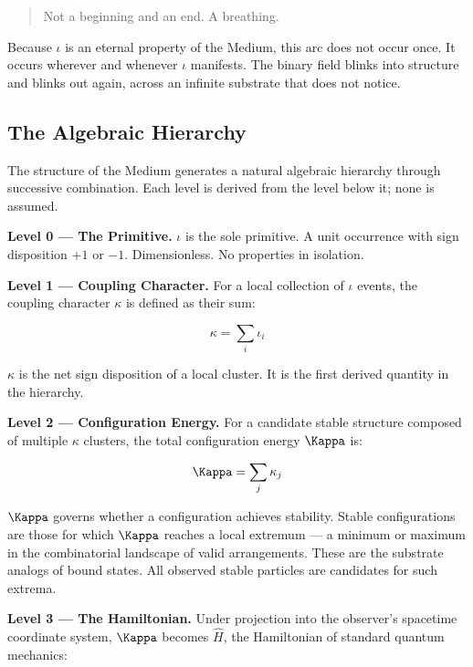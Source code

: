 \documentclass[11pt,letterpaper]{article}
\begin{document}
\begin{quote}
Not a beginning and an end. A breathing.
\end{quote}

Because \(\iota\) is an eternal property of the Medium, this arc does not occur once. It occurs wherever and whenever \(\iota\) manifests. The binary field blinks into structure and blinks out again, across an infinite substrate that does not notice.
\subsection{The Algebraic Hierarchy}
\label{sec:orgb4d00d2}

The structure of the Medium generates a natural algebraic hierarchy through successive combination. Each level is derived from the level below it; none is assumed.

\textbf{Level 0 --- The Primitive.} \(\iota\) is the sole primitive. A unit occurrence with sign disposition \(+1\) or \(-1\). Dimensionless. No properties in isolation.

\textbf{Level 1 --- Coupling Character.} For a local collection of \(\iota\) events, the coupling character \(\kappa\) is defined as their sum:

\begin{equation}
\kappa = \sum_{i} \iota_i
\end{equation}

\(\kappa\) is the net sign disposition of a local cluster. It is the first derived quantity in the hierarchy.

\textbf{Level 2 --- Configuration Energy.} For a candidate stable structure composed of multiple \(\kappa\) clusters, the total configuration energy \(\Kappa\) is:

\begin{equation}
\Kappa = \sum_{j} \kappa_j
\end{equation}

\(\Kappa\) governs whether a configuration achieves stability. Stable configurations are those for which \(\Kappa\) reaches a local extremum --- a minimum or maximum in the combinatorial landscape of valid arrangements. These are the substrate analogs of bound states. All observed stable particles are candidates for such extrema.

\textbf{Level 3 --- The Hamiltonian.} Under projection into the observer's spacetime coordinate system, \(\Kappa\) becomes \(\hat{H}\), the Hamiltonian of standard quantum mechanics:
\end{document}
